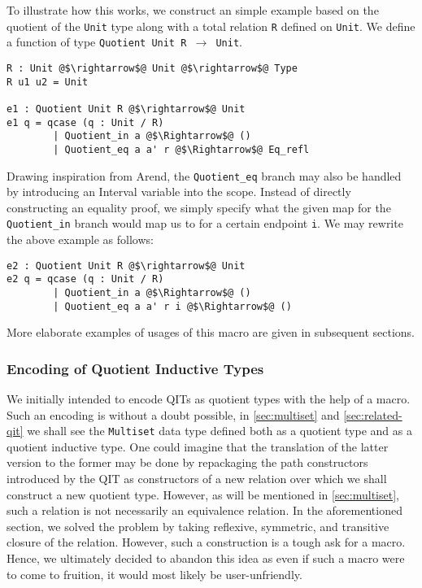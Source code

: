 \documentclass[12pt,twoside,maitrise]{dms}
\theoremstyle{definition}
\numberwithin{equation}{section}
\numberwithin{table}{chapter}
\numberwithin{figure}{chapter}
\newcommand\id[1] {\texttt{#1}}
\newcommand\fn[1] {\texttt{#1}}
\begin{document}
To illustrate how this works, we construct an simple example based on the
quotient of the \id{Unit} type along with a total relation \id{R} defined on
\id{Unit}. We define a function of type \fn{Quotient Unit R $\rightarrow$ Unit}.

\begin{verbatim}
R : Unit @$\rightarrow$@ Unit @$\rightarrow$@ Type
R u1 u2 = Unit

e1 : Quotient Unit R @$\rightarrow$@ Unit
e1 q = qcase (q : Unit / R)
        | Quotient_in a @$\Rightarrow$@ ()
        | Quotient_eq a a' r @$\Rightarrow$@ Eq_refl
\end{verbatim}

Drawing inspiration from Arend, the \id{Quotient\_eq} branch may also be handled
by introducing an Interval variable into the scope. Instead of directly
constructing an equality proof, we simply specify what the given map for the
\id{Quotient\_in} branch would map us to for a certain endpoint \id{i}. We may
rewrite the above example as follows:

\begin{verbatim}
e2 : Quotient Unit R @$\rightarrow$@ Unit
e2 q = qcase (q : Unit / R)
        | Quotient_in a @$\Rightarrow$@ ()
        | Quotient_eq a a' r i @$\Rightarrow$@ ()
\end{verbatim}

More elaborate examples of usages of this macro are given in subsequent
sections.

\subsubsection*{Encoding of Quotient Inductive Types}

We initially intended to encode QITs as quotient types with the help of a macro.
Such an encoding is without a doubt possible, in \autoref{sec:multiset} and
\autoref{sec:related-qit} we shall see the \id{Multiset} data type defined both
as a quotient type and as a quotient inductive type. One could imagine that the
translation of the latter version to the former may be done by repackaging the
path constructors introduced by the QIT as constructors of a new relation over
which we shall construct a new quotient type. However, as will be mentioned in
\autoref{sec:multiset}, such a relation is not necessarily an equivalence
relation. In the aforementioned section, we solved the problem by taking
reflexive, symmetric, and transitive closure of the relation. However, such a
construction is a tough ask for a macro. Hence, we ultimately decided to abandon
this idea as even if such a macro were to come to fruition, it would most likely
be user-unfriendly.
\end{document}
